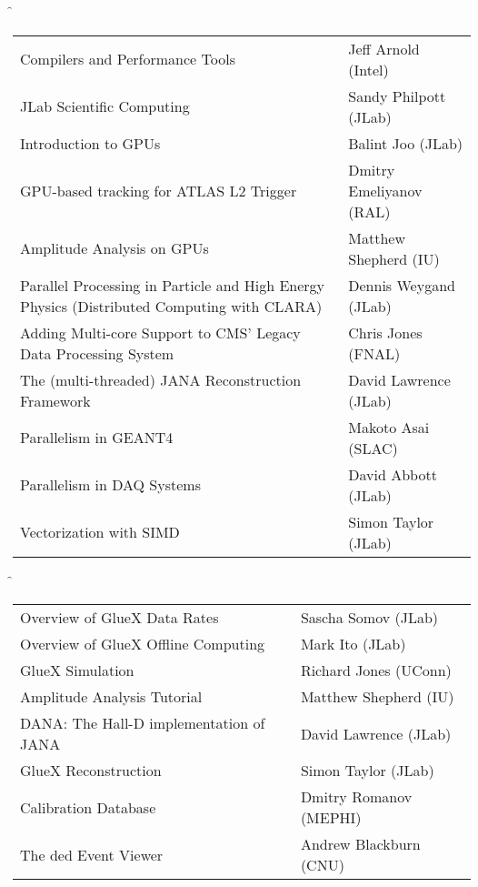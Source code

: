 \f{
\small
\begin{tabular}{| p{2.8 in} | l |}
\hline
   Compilers and Performance Tools & Jeff Arnold (Intel) \\
   JLab Scientific Computing & Sandy Philpott (JLab) \\
   Introduction to GPUs & Balint Joo (JLab) \\
   GPU-based tracking for ATLAS L2 Trigger & Dmitry Emeliyanov (RAL) \\
   Amplitude Analysis on GPUs & Matthew Shepherd (IU) \\
   Parallel Processing in Particle and High Energy Physics (Distributed Computing with CLARA) & Dennis Weygand (JLab) \\
   Adding Multi-core Support to CMS' Legacy Data Processing System & Chris Jones (FNAL) \\
   The (multi-threaded) JANA Reconstruction Framework & David Lawrence (JLab) \\
   Parallelism in GEANT4 & Makoto Asai (SLAC) \\
   Parallelism in DAQ Systems & David Abbott (JLab) \\
   Vectorization with SIMD & Simon Taylor (JLab) \\
\hline
\end{tabular}
}

\f{
\small
\begin{tabular}{| p{2.8 in} | l |}
\hline
   Overview of GlueX Data Rates & Sascha Somov (JLab) \\
   Overview of GlueX Offline Computing & Mark Ito (JLab) \\
   GlueX Simulation & Richard Jones (UConn) \\
   Amplitude Analysis Tutorial & Matthew Shepherd (IU) \\
   DANA: The Hall-D implementation of JANA & David Lawrence (JLab) \\
   GlueX Reconstruction & Simon Taylor (JLab) \\
   Calibration Database & Dmitry Romanov (MEPHI) \\
   The ded Event Viewer & Andrew Blackburn (CNU) \\
\hline
\end{tabular}
}
